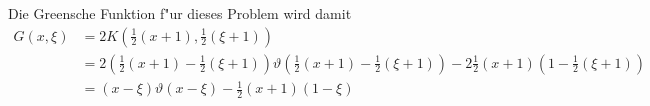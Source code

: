 {\begin{loesung}
Die Greensche Funktion f"ur dieses Problem wird damit
\begin{align*}
G(x,\xi)&=
2K({\textstyle\frac12}(x+1),{\textstyle\frac12}(\xi+1))
\\
&=
2
({\textstyle\frac12}(x+1)-\textstyle{\frac12}(\xi+1))
\vartheta({\textstyle\frac12}(x+1)-{\textstyle\frac12}(\xi+1))
-2{\textstyle\frac12}(x+1)(1-{\textstyle\frac12}(\xi+1))
\\
&=
(x-\xi)\vartheta(x-\xi)-{\textstyle\frac12}(x+1)(1-\xi)
\end{align*}
\end{loesung}
}{}

